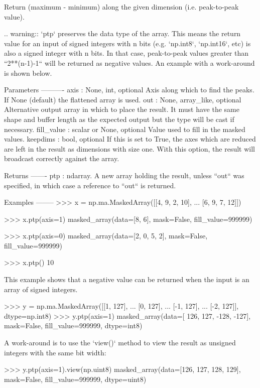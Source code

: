 \begin{DoxyVerb}Return (maximum - minimum) along the given dimension
(i.e. peak-to-peak value).

.. warning::
    `ptp` preserves the data type of the array. This means the
    return value for an input of signed integers with n bits
    (e.g. `np.int8`, `np.int16`, etc) is also a signed integer
    with n bits.  In that case, peak-to-peak values greater than
    ``2**(n-1)-1`` will be returned as negative values. An example
    with a work-around is shown below.

Parameters
----------
axis : {None, int}, optional
    Axis along which to find the peaks.  If None (default) the
    flattened array is used.
out : {None, array_like}, optional
    Alternative output array in which to place the result. It must
    have the same shape and buffer length as the expected output
    but the type will be cast if necessary.
fill_value : scalar or None, optional
    Value used to fill in the masked values.
keepdims : bool, optional
    If this is set to True, the axes which are reduced are left
    in the result as dimensions with size one. With this option,
    the result will broadcast correctly against the array.

Returns
-------
ptp : ndarray.
    A new array holding the result, unless ``out`` was
    specified, in which case a reference to ``out`` is returned.

Examples
--------
>>> x = np.ma.MaskedArray([[4, 9, 2, 10],
...                        [6, 9, 7, 12]])

>>> x.ptp(axis=1)
masked_array(data=[8, 6],
     mask=False,
       fill_value=999999)

>>> x.ptp(axis=0)
masked_array(data=[2, 0, 5, 2],
     mask=False,
       fill_value=999999)

>>> x.ptp()
10

This example shows that a negative value can be returned when
the input is an array of signed integers.

>>> y = np.ma.MaskedArray([[1, 127],
...                        [0, 127],
...                        [-1, 127],
...                        [-2, 127]], dtype=np.int8)
>>> y.ptp(axis=1)
masked_array(data=[ 126,  127, -128, -127],
     mask=False,
       fill_value=999999,
    dtype=int8)

A work-around is to use the `view()` method to view the result as
unsigned integers with the same bit width:

>>> y.ptp(axis=1).view(np.uint8)
masked_array(data=[126, 127, 128, 129],
     mask=False,
       fill_value=999999,
    dtype=uint8)
\end{DoxyVerb}
 \mbox{\label{classnumpy_1_1ma_1_1core_1_1MaskedArray_a048bd7a9ff645e2b94ac7e77bf8d7dfc}} 
